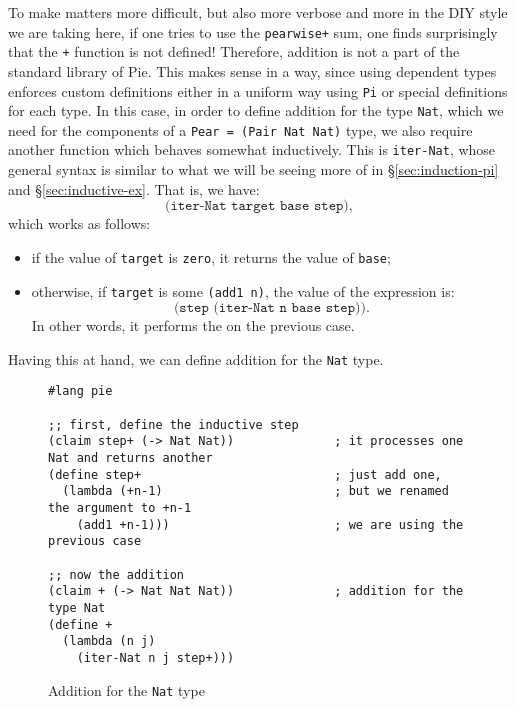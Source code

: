 To make matters more difficult, but also more verbose and more in the DIY
style we are taking here, if one tries to use the \texttt{pearwise+} sum,
one finds surprisingly that the \texttt{+} function is not defined! Therefore,
addition is not a part of the standard library of Pie. This makes sense in a way,
since using dependent types enforces custom definitions either in a uniform
way using \texttt{Pi} or special definitions for each type. In this case,
in order to define addition for the type \texttt{Nat}, which we need for the
components of a \texttt{Pear = (Pair Nat Nat)} type, we also require another
function which behaves somewhat inductively. This is \texttt{iter-Nat},
whose general syntax is similar to what we will be seeing more of in
\S\ref{sec:induction-pi} and \S\ref{sec:inductive-ex}. That is, we have:
\[
  \texttt{(iter-Nat target base step)},
\]
which works as follows:
\begin{itemize}
\item if the value of \texttt{target} is \texttt{zero}, it returns
  the value of \texttt{base};
\item otherwise, if \texttt{target} is some \texttt{(add1 n)},
  the value of the expression is:
  \[
    \texttt{(step (iter-Nat n base step))}.
  \]
  In other words, it performs the 
  on the previous case.
\end{itemize}

Having this at hand, we can define addition for the \texttt{Nat} type.
\begin{figure}[!htbp]
  
  {
    \small
\begin{verbatim}
#lang pie

;; first, define the inductive step
(claim step+ (-> Nat Nat))              ; it processes one Nat and returns another
(define step+                           ; just add one,
  (lambda (+n-1)                        ; but we renamed the argument to +n-1
    (add1 +n-1)))                       ; we are using the previous case

;; now the addition
(claim + (-> Nat Nat Nat))              ; addition for the type Nat
(define +                               
  (lambda (n j)
    (iter-Nat n j step+)))
\end{verbatim}
  }
  \caption{Addition for the \texttt{Nat} type}
  \label{fig:plus-nat}
\end{figure}


